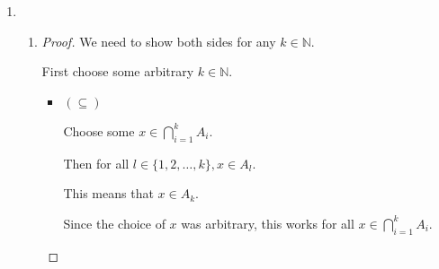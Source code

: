 \documentclass[12pt,letterpaper]{article}
\begin{document}
\begin{enumerate}
\begin{enumerate}
\begin{enumerate}
\begin{proof}
                Since the choice of $x$ was arbitrary, this works for all $x \in \bigcup\limits_{i = 1}^k A_i$.

                Then every $x$ contained in $\bigcup\limits_{i = 1}^k A_i$ is also in $\bigcup\limits_{i = 1}^m A_i$.

                Thus $\bigcup\limits_{i = 1}^k A_i \subseteq \bigcup\limits_{i = 1}^m A_i$
              \end{proof}
            \item
              \begin{proof}
                Choose an arbitrary $x \in \bigcap\limits_{i = 1}^m A_i$.

                Then for all $l \in \{1, 2, \dots, k, k + 1, \dots, m\}, x \in A_l$.

                This implies that for all $l \in \{1, 2, \dots, k\}, x \in A_l$.

                Which means that $x \in \bigcap\limits_{i = 1}^k A_i$.

                Since the choice of $x$ was arbitrary, this works for all $x \in \bigcap\limits_{i = 1}^m A_i$.

                Then every $x$ contained in $\bigcap\limits_{i = 1}^m A_i$ is also in $\bigcap\limits_{i = 1}^k A_i$.

                Thus, $\bigcap\limits_{i = 1}^m A_i \subseteq \bigcap\limits_{i = 1}^k A_i$.
              \end{proof}
          \end{enumerate}
        \item
          \begin{enumerate}
            \item
              \begin{proof}
                We need to show both sides for any $k \in \mathbb{N}$.

                First choose some arbitrary $k \in \mathbb{N}$.
                \begin{itemize}
                  \item $(\subseteq)$

                    Choose some $x \in \bigcap\limits_{i = 1}^k A_i$.

                    Then for all $l \in \{1, 2, \dots, k\}, x \in A_l$.

                    This means that $x \in A_k$.

                    Since the choice of $x$ was arbitrary, this works for all $x \in \bigcap\limits_{i = 1}^k A_i$.


\end{itemize}
\end{proof}
\end{enumerate}
\end{enumerate}
\end{enumerate}
\end{document}
